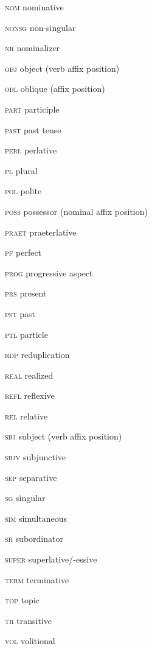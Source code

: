 \begin{refsection}
\begin{multicols}{2}
	\textsc{nom}  nominative
	
	\textsc{nonsg}  non-singular
	
	\textsc{nr}  nominalizer
	
	\textsc{obj}  object (verb affix position)
	
	\textsc{obl}  oblique (affix position)
	
	\textsc{part}  participle
	
	\textsc{past}  past tense
	
	\textsc{perl}  perlative
	
	\textsc{pl}  plural
	
	\textsc{pol}  polite
	
	\textsc{poss}  possessor (nominal affix position)
	
	\textsc{praet}  praeterlative
	
	\textsc{pf}  perfect
	
	\textsc{prog}  progressive aspect
	
	\textsc{prs}  present
	
	\textsc{pst}  past
	
	\textsc{ptl}  particle
	
	\textsc{rdp}  reduplication
	
	\textsc{real}  realized
	
	\textsc{refl}  reflexive
	
	\textsc{rel}  relative
	
	\textsc{sbj}  subject (verb affix position)
	
	\textsc{sbjv}  subjunctive
	
	\textsc{sep}  separative
	
	\textsc{sg}  singular
	
	\textsc{sim}  simultaneous
	
	\textsc{sr}  subordinator
	
	\textsc{super}  superlative/-essive
	
	\textsc{term}  terminative
	
	\textsc{top}  topic
	
	\textsc{tr}  transitive
	
	\textsc{vol}  volitional
\end{multicols}

\printbibliography[heading=subbibliography]
\end{refsection}

\setlength{\parindent}{10pt}